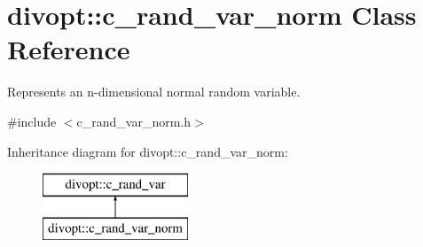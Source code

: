 \hypertarget{classdivopt_1_1c__rand__var__norm}{\section{divopt\-:\-:c\-\_\-rand\-\_\-var\-\_\-norm \-Class \-Reference}
\label{classdivopt_1_1c__rand__var__norm}
}


\-Represents an n-\/dimensional normal random variable.  




{\ttfamily \#include $<$c\-\_\-rand\-\_\-var\-\_\-norm.\-h$>$}

\-Inheritance diagram for divopt\-:\-:c\-\_\-rand\-\_\-var\-\_\-norm\-:\begin{figure}[H]
\begin{center}
\leavevmode
\includegraphics[height=2.000000cm]{classdivopt_1_1c__rand__var__norm}
\end{center}
\end{figure}
